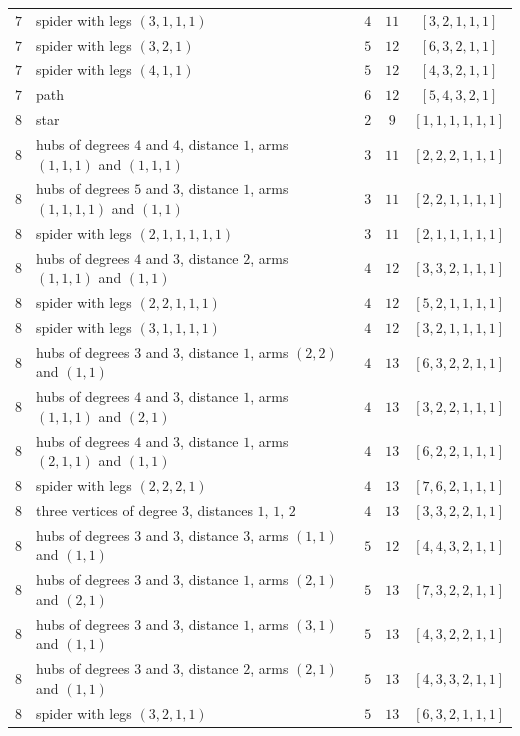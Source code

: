 \begin{longtable}{@{} c >{\raggedright\arraybackslash}p{3.65in} c c c @{}}
$7$ & spider with legs $(3,1,1,1)$ & $4$ & $11$ & $[3,2,1,1,1]$ \\
$7$ & spider with legs $(3,2,1)$ & $5$ & $12$ & $[6,3,2,1,1]$ \\
$7$ & spider with legs $(4,1,1)$ & $5$ & $12$ & $[4,3,2,1,1]$ \\
$7$ & path & $6$ & $12$ & $[5,4,3,2,1]$ \\
\addlinespace[0.35em]
$8$ & star & $2$ & $9$ & $[1,1,1,1,1,1]$ \\
$8$ & hubs of degrees $4$ and $4$, distance $1$, arms $(1,1,1)$ and $(1,1,1)$ & $3$ & $11$ & $[2,2,2,1,1,1]$ \\
$8$ & hubs of degrees $5$ and $3$, distance $1$, arms $(1,1,1,1)$ and $(1,1)$ & $3$ & $11$ & $[2,2,1,1,1,1]$ \\
$8$ & spider with legs $(2,1,1,1,1,1)$ & $3$ & $11$ & $[2,1,1,1,1,1]$ \\
$8$ & hubs of degrees $4$ and $3$, distance $2$, arms $(1,1,1)$ and $(1,1)$ & $4$ & $12$ & $[3,3,2,1,1,1]$ \\
$8$ & spider with legs $(2,2,1,1,1)$ & $4$ & $12$ & $[5,2,1,1,1,1]$ \\
$8$ & spider with legs $(3,1,1,1,1)$ & $4$ & $12$ & $[3,2,1,1,1,1]$ \\
$8$ & hubs of degrees $3$ and $3$, distance $1$, arms $(2,2)$ and $(1,1)$ & $4$ & $13$ & $[6,3,2,2,1,1]$ \\
$8$ & hubs of degrees $4$ and $3$, distance $1$, arms $(1,1,1)$ and $(2,1)$ & $4$ & $13$ & $[3,2,2,1,1,1]$ \\
$8$ & hubs of degrees $4$ and $3$, distance $1$, arms $(2,1,1)$ and $(1,1)$ & $4$ & $13$ & $[6,2,2,1,1,1]$ \\
$8$ & spider with legs $(2,2,2,1)$ & $4$ & $13$ & $[7,6,2,1,1,1]$ \\
$8$ & three vertices of degree $3$, distances $1$, $1$, $2$ & $4$ & $13$ & $[3,3,2,2,1,1]$ \\
$8$ & hubs of degrees $3$ and $3$, distance $3$, arms $(1,1)$ and $(1,1)$ & $5$ & $12$ & $[4,4,3,2,1,1]$ \\
$8$ & hubs of degrees $3$ and $3$, distance $1$, arms $(2,1)$ and $(2,1)$ & $5$ & $13$ & $[7,3,2,2,1,1]$ \\
$8$ & hubs of degrees $3$ and $3$, distance $1$, arms $(3,1)$ and $(1,1)$ & $5$ & $13$ & $[4,3,2,2,1,1]$ \\
$8$ & hubs of degrees $3$ and $3$, distance $2$, arms $(2,1)$ and $(1,1)$ & $5$ & $13$ & $[4,3,3,2,1,1]$ \\
$8$ & spider with legs $(3,2,1,1)$ & $5$ & $13$ & $[6,3,2,1,1,1]$ \\

\end{longtable}
